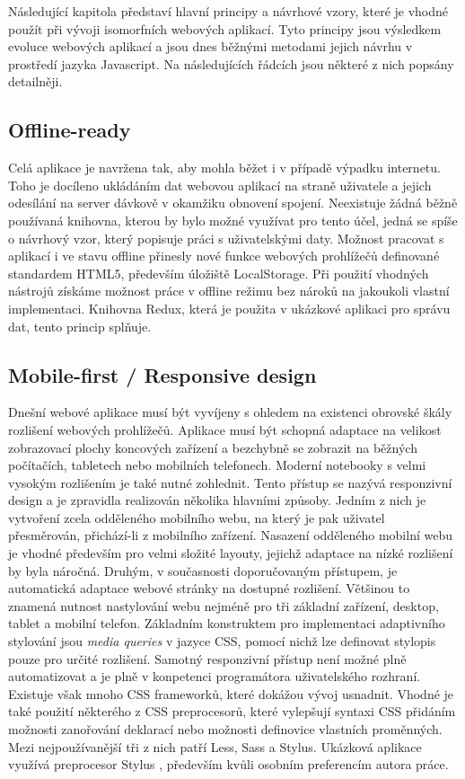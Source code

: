 Následující kapitola představí hlavní principy a návrhové vzory, které je vhodné použít při vývoji isomorfních webových aplikací. Tyto principy jsou výsledkem evoluce webových aplikací a jsou dnes běžnými metodami jejich návrhu v prostředí jazyka Javascript. Na následujících řádcích jsou některé z nich popsány detailněji.

\subsection{Offline-ready}
Celá aplikace je navržena tak, aby mohla běžet i v případě výpadku internetu. Toho je docíleno ukládáním dat webovou aplikací na straně uživatele a jejich odesílání na server dávkově v okamžiku obnovení spojení. Neexistuje žádná běžně používaná knihovna, kterou by bylo možné využívat pro tento účel, jedná se spíše o návrhový vzor, který popisuje práci s uživatelskými daty. Možnost pracovat s aplikací i ve stavu offline přinesly nové funkce webových prohlížečů definované standardem HTML5, především úložiště LocalStorage. Při použití vhodných nástrojů získáme možnost práce v offline režimu bez nároků na jakoukoli vlastní implementaci. Knihovna Redux, která je použita v ukázkové aplikaci pro správu dat, tento princip splňuje.

\subsection{Mobile-first / Responsive design}
Dnešní webové aplikace musí být vyvíjeny s ohledem na existenci obrovské škály rozlišení webových prohlížečů. Aplikace musí být schopná adaptace na velikost zobrazovací plochy koncových zařízení a bezchybně se zobrazit na běžných počítačích, tabletech nebo mobilních telefonech. Moderní notebooky s velmi vysokým rozlišením je také nutné zohlednit. Tento přístup se nazývá responzivní design a je zpravidla realizován několika hlavními způsoby. Jedním z nich je vytvoření zcela odděleného mobilního webu, na který je pak uživatel přesměrován, přichází-li z mobilního zařízení. Nasazení odděleného mobilní webu je vhodné především pro velmi složité layouty, jejichž adaptace na nízké rozlišení by byla náročná. Druhým, v současnosti doporučovaným přístupem, je automatická adaptace webové stránky na dostupné rozlišení. Většinou to znamená nutnost nastylování webu nejméně pro tři základní zařízení, desktop, tablet a mobilní telefon. Základním konstruktem pro implementaci adaptivního stylování jsou \textit{media queries} v jazyce CSS, pomocí nichž lze definovat stylopis pouze pro určité rozlišení. Samotný responzivní přístup není možné plně automatizovat a je plně v konpetenci programátora uživatelského rozhraní. Existuje však mnoho CSS frameworků, které dokážou vývoj usnadnit. Vhodné je také použití některého z CSS preprocesorů, které vylepšují syntaxi CSS přidáním možnosti zanořování deklarací nebo možnosti definovice vlastních proměnných. Mezi nejpoužívanější tři z nich patří Less, Sass a Stylus. Ukázková aplikace využívá preprocesor Stylus \cite{stylus}, především kvůli osobním preferencím autora práce.

